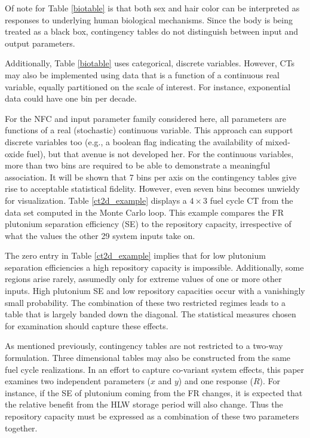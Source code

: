 Of note for Table \ref{biotable} is that both sex and hair color can be interpreted as responses to 
underlying human biological mechanisms.  Since the body is being treated as a black box, contingency 
tables do not distinguish between input and output parameters.

Additionally, Table \ref{biotable} uses categorical, discrete variables.  However, CTs may also be 
implemented using data that is a function of a continuous real variable, equally partitioned on the scale of
interest. For instance, exponential data could have one bin per decade.

For the NFC and input parameter family considered here, all parameters are functions of a real 
(stochastic) continuous variable.  This approach can support discrete variables too (e.g., a 
boolean flag indicating the availability of mixed-oxide fuel), but that avenue is not developed 
her. For the continuous variables, more than two bins are required to
be able to demonstrate a meaningful association.  It will be shown that 7 bins per axis on the 
contingency tables give rise to acceptable
statistical fidelity.  However, even seven bins becomes unwieldy for visualization.
Table \ref{ct2d_example} displays a $4\times 3$ fuel cycle CT from the data set computed in
the Monte Carlo loop.   This example compares the FR plutonium separation efficiency (SE) to the 
repository capacity, irrespective of what the values the other 29 system inputs take on.



The zero entry in Table \ref{ct2d_example} implies that for low plutonium separation efficiencies 
a high repository capacity is impossible.
Additionally, some regions arise rarely, assumedly only for extreme values of one or more other inputs.
High plutonium SE and low repository capacities occur with a vanishingly
small probability.  The combination of these two restricted regimes leads to a table that is 
largely banded down the diagonal.
The statistical measures chosen for examination should capture these effects.

As mentioned previously, contingency tables are not restricted to a two-way formulation.  
Three dimensional tables may also be constructed from the same
fuel cycle realizations.  In an effort to capture co-variant system effects, this paper 
examines two independent parameters ($x$ and $y$) and one response ($R$).  For instance, 
if the SE of plutonium coming from the FR changes, it is expected that the relative benefit 
from the HLW storage period will also change.
Thus the repository capacity must be expressed as a combination of these two parameters together.

